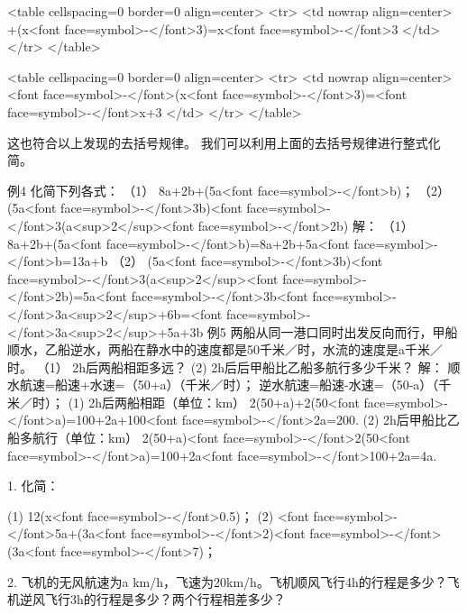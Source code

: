 <table cellspacing=0  border=0 align=center>
<tr>
  <td nowrap align=center>
    +(x<font face=symbol>-</font>3)=x<font face=symbol>-</font>3
  </td>
</tr>
</table>

		                     
<table cellspacing=0  border=0 align=center>
<tr>
  <td nowrap align=center>
    <font face=symbol>-</font>(x<font face=symbol>-</font>3)=<font face=symbol>-</font>x+3
  </td>
</tr>
</table>

		           这也符合以上发现的去括号规律。
		               我们可以利用上面的去括号规律进行整式化简。
		
		\beginexample
			例4 化简下列各式：
			（1）  8a+2b+(5a<font face=symbol>-</font>b)；  （2）  (5a<font face=symbol>-</font>3b)<font face=symbol>-</font>3(a<sup>2</sup><font face=symbol>-</font>2b)
			 解： （1）  8a+2b+(5a<font face=symbol>-</font>b)=8a+2b+5a<font face=symbol>-</font>b=13a+b
			      （2）  (5a<font face=symbol>-</font>3b)<font face=symbol>-</font>3(a<sup>2</sup><font face=symbol>-</font>2b)=5a<font face=symbol>-</font>3b<font face=symbol>-</font>3a<sup>2</sup>+6b=<font face=symbol>-</font>3a<sup>2</sup>+5a+3b
			例5  两船从同一港口同时出发反向而行，甲船顺水，乙船逆水，两船在静水中的速度都是50千米／时，水流的速度是a千米／时。
			 （1）  2h后两船相距多远？
			  (2)    2h后后甲船比乙船多航行多少千米？
			 解： 顺水航速=船速+水速=（50+a）（千米／时）；
			      逆水航速=船速-水速=（50-a）（千米／时）；
	              (1) 2h后两船相距（单位：km）
	                      2(50+a)+2(50<font face=symbol>-</font>a)=100+2a+100<font face=symbol>-</font>2a=200.
	              (2) 2h后甲船比乙船多航行（单位：km）
	                      2(50+a)<font face=symbol>-</font>2(50<font face=symbol>-</font>a)=100+2a<font face=symbol>-</font>100+2a=4a.
		\endexample
		
		\beginexercise
			
			
			1. 化简：
			
			(1) 12(x<font face=symbol>-</font>0.5)；     (2) <font face=symbol>-</font>5a+(3a<font face=symbol>-</font>2)<font face=symbol>-</font>(3a<font face=symbol>-</font>7)；
			
			2. 飞机的无风航速为a km/h，飞速为20km/h。飞机顺风飞行4h的行程是多少？飞机逆风飞行3h的行程是多少？两个行程相差多少？
			
		\endexercise
	
